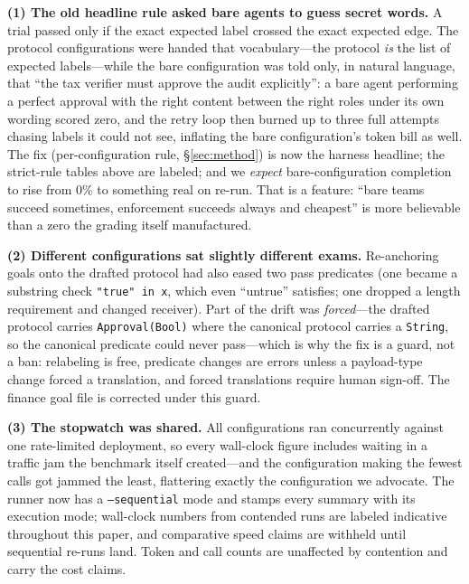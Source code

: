 \documentclass{article}
\begin{document}
\textbf{(1) The old headline rule asked bare agents to guess secret words.} A trial passed only if the exact expected label crossed the exact expected edge. The protocol configurations were handed that vocabulary---the protocol \emph{is} the list of expected labels---while the bare configuration was told only, in natural language, that ``the tax verifier must approve the audit explicitly'': a bare agent performing a perfect approval with the right content between the right roles under its own wording scored zero, and the retry loop then burned up to three full attempts chasing labels it could not see, inflating the bare configuration's token bill as well. The fix (per-configuration rule, \S\ref{sec:method}) is now the harness headline; the strict-rule tables above are labeled; and we \emph{expect} bare-configuration completion to rise from 0\% to something real on re-run. That is a feature: ``bare teams succeed sometimes, enforcement succeeds always and cheapest'' is more believable than a zero the grading itself manufactured.

\textbf{(2) Different configurations sat slightly different exams.} Re-anchoring goals onto the drafted protocol had also eased two pass predicates (one became a substring check \texttt{"true" in x}, which even ``untrue'' satisfies; one dropped a length requirement and changed receiver). Part of the drift was \emph{forced}---the drafted protocol carries \texttt{Approval(Bool)} where the canonical protocol carries a \texttt{String}, so the canonical predicate could never pass---which is why the fix is a guard, not a ban: relabeling is free, predicate changes are errors unless a payload-type change forced a translation, and forced translations require human sign-off. The finance goal file is corrected under this guard.

\textbf{(3) The stopwatch was shared.} All configurations ran concurrently against one rate-limited deployment, so every wall-clock figure includes waiting in a traffic jam the benchmark itself created---and the configuration making the fewest calls got jammed the least, flattering exactly the configuration we advocate. The runner now has a \texttt{--sequential} mode and stamps every summary with its execution mode; wall-clock numbers from contended runs are labeled indicative throughout this paper, and comparative speed claims are withheld until sequential re-runs land. Token and call counts are unaffected by contention and carry the cost claims.
\end{document}
